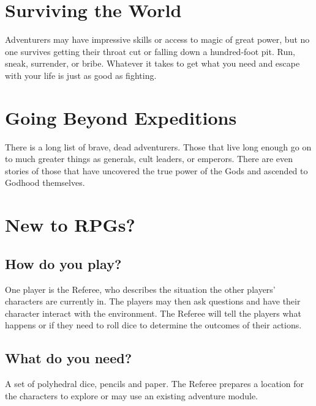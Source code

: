 \documentclass[itdr]{subfiles}
\begin{document}
\vfill
\break

\section*{Surviving the World}

Adventurers may have impressive skills or access to magic of great power, but no one survives getting their throat cut or falling down a hundred-foot pit. Run, sneak, surrender, or bribe. Whatever it takes to get what you need and escape with your life is just as good as fighting.

\section*{Going Beyond Expeditions}
There is a long list of brave, dead adventurers. Those that live long enough go on to much greater things as generals, cult leaders, or emperors. There are even stories of those that have uncovered the true power of the Gods and ascended to Godhood themselves.


\section*{New to RPGs?}

\subsection*{How do you play?}
One player is the Referee, who describes the situation the other players' characters are currently in. The players may then ask questions and have their character interact with the environment. The Referee will tell the players what happens or if they need to roll dice to determine the outcomes of their actions.

\subsection*{What do you need?}
A set of polyhedral dice, pencils and paper. The Referee prepares a location for the characters to explore or may use an existing adventure module.
\end{document}
